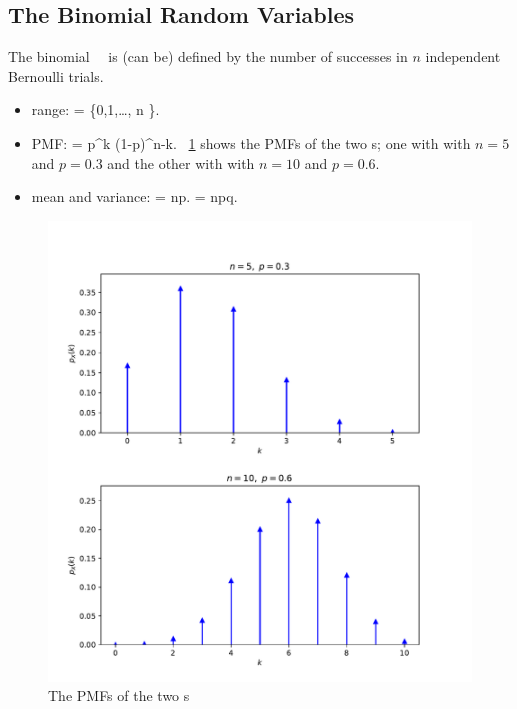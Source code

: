 \subsection{The Binomial Random Variables}
\bit
	\item The binomial \randvar\ \X\
	is (can be) defined by the number of successes in
	$n$ independent Bernoulli trials.
	\begin{itemize}
		\item range:
			\ssx = \{0,1,\ldots, n \}.
		\eeql
		\item PMF:
			 =  p^k (1-p)^{n-k}.
		\eeql
		\figurename~\ref{fig-binom-pmf} shows the PMFs of the two \binomrv s;
		one with with $n=5$ and $p=0.3$
		and the other with with $n=10$ and $p=0.6$.

		\item mean and variance:
			 = np.
		\eeql
			 = npq.
		\eeql
	\end{itemize}
	
	\begin{figure}\begin{center}
	\includegraphics[width=.7\linewidth]{figures/binom_pmf}
	\caption{The PMFs of the two \binomrv s}
	\label{fig-binom-pmf}
	\end{center}\end{figure}

